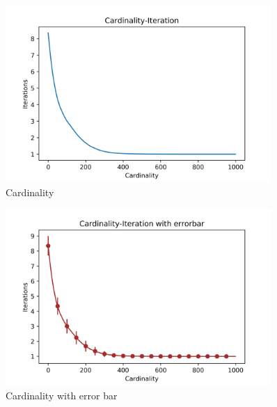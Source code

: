 \documentclass[a4paper,12pt]{article}
\begin{document}
    \begin{figure}[H]
    	\centering
    	\includegraphics[width=0.9\textwidth]{Card50_4_1000_800}
    	\caption{Cardinality}\label{Card50_4_1000_800}
    \end{figure}
    \begin{figure}[H]
    	\centering
    	\includegraphics[width=0.9\textwidth]{CardErr50_4_1000_800}
    	\caption{Cardinality with error bar}\label{CardErr50_4_1000_800}
    \end{figure}
\end{document}
